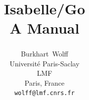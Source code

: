\documentclass[abstract=on,fontsize=10pt,a4paper,mpinclude=true,
oneside,
pagesize,DIV=14]{scrartcl}
\title{Isabelle/Go\\[.3em]\large A Manual}
\author{
Burkhart~Wolff\textsuperscript{\orcidlink{0000-0002-9648-7663}}\\\small
Universit\'e Paris-Saclay\\
LMF\\
Paris, France\\
\texttt{wolff@lmf.cnrs.fr}
}
\date{}
\begin{document}
\renewcommand{\sectionautorefname}{Section}
\renewcommand{\subsectionautorefname}{Section}
\renewcommand{\subsubsectionautorefname}{Section}

\maketitle



\printbibliography
\end{document}
